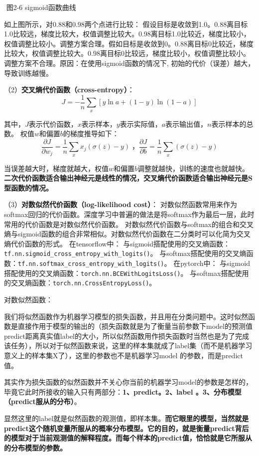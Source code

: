 ​ 图2-6 sigmoid函数曲线

如上图所示，对0.88和0.98两个点进行比较： ​
假设目标是收敛到1.0。0.88离目标1.0比较远，梯度比较大，权值调整比较大。0.98离目标1.0比较近，梯度比较小，权值调整比较小。调整方案合理。
​
假如目标是收敛到0。0.88离目标0比较近，梯度比较大，权值调整比较大。0.98离目标0比较远，梯度比较小，权值调整比较小。调整方案不合理。
​ 原因：在使用sigmoid函数的情况下,
初始的代价（误差）越大，导致训练越慢。

（2）\textbf{交叉熵代价函数（cross-entropy）}： \[
J = -\frac{1}{n}\sum_x[y\ln a + (1-y)\ln{(1-a)}]
\]

其中，$J$表示代价函数，$x$表示样本，$y$表示实际值，$a$表示输出值，$n$表示样本的总数。
权值$w$和偏置$b​$的梯度推导如下： \[
\frac{\partial J}{\partial w_j}=\frac{1}{n}\sum_{x}x_j(\sigma{(z)}-y)\;，
\frac{\partial J}{\partial b}=\frac{1}{n}\sum_{x}(\sigma{(z)}-y)
\]

当误差越大时，梯度就越大，权值$w$和偏置$b$调整就越快，训练的速度也就越快。
\textbf{二次代价函数适合输出神经元是线性的情况，交叉熵代价函数适合输出神经元是S型函数的情况。}

（3）\textbf{对数似然代价函数（log-likelihood cost）}：
对数似然函数常用来作为softmax回归的代价函数。深度学习中普遍的做法是将softmax作为最后一层，此时常用的代价函数是对数似然代价函数。
对数似然代价函数与softmax的组合和交叉熵与sigmoid函数的组合非常相似。对数似然代价函数在二分类时可以化简为交叉熵代价函数的形式。
在tensorflow中：
与sigmoid搭配使用的交叉熵函数：\texttt{tf.nn.sigmoid\_cross\_entropy\_with\_logits()}。
与softmax搭配使用的交叉熵函数：\texttt{tf.nn.softmax\_cross\_entropy\_with\_logits()}。
在pytorch中：
与sigmoid搭配使用的交叉熵函数：\texttt{torch.nn.BCEWithLogitsLoss()}。
与softmax搭配使用的交叉熵函数：\texttt{torch.nn.CrossEntropyLoss()}。

对数似然函数：

​
我们将似然函数作为机器学习模型的损失函数，并且用在分类问题中。这时似然函数是直接作用于模型的输出的（损失函数就是为了衡量当前参数下model的预测值predict距离真实值label的大小，所以似然函数用作损失函数时当然也是为了完成该任务），所以对于似然函数来说，这里的样本集就成了label集（而不是机器学习意义上的样本集X了），这里的参数也不是机器学习model
的参数，而是predict值。

其实作为损失函数的似然函数并不关心你当前的机器学习model的参数是怎样的，毕竟它此时所接收的输入只有两部分：\textbf{1、predict。2、label
。3、分布模型（predict服从的分布）}。

显然这里的label就是似然函数的观测值，即样本集。\textbf{而它眼里的模型，当然就是predict这个随机变量所服从的概率分布模型。它的目的，就是衡量predict背后的模型对于当前观测值的解释程度。而每个样本的predict值，恰恰就是它所服从的分布模型的参数。}

